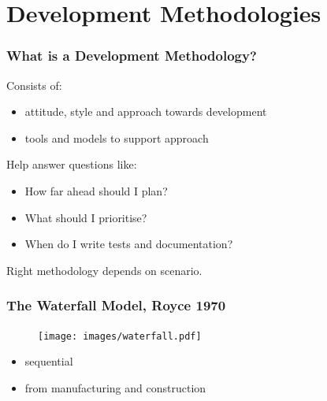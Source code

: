 \documentclass{beamer}
\begin{document}
\section{Development Methodologies}


\begin{frame}
 \frametitle{What is a Development Methodology?}

\begin{block}{Consists of:}
\begin{itemize}
  \item attitude, style and approach towards development
  \item tools and models to support approach
\end{itemize}
\end{block}

\begin{block}{Help answer questions like:}
\begin{itemize}
  \item How far ahead should I plan?
  \item What should I prioritise?
  \item When do I write tests and documentation?
\end{itemize}
\end{block}

\vspace*{5mm}
\centering
\alert<2>{\large Right methodology depends on scenario.}
 
\end{frame}


\begin{frame}
 \frametitle{The Waterfall Model, Royce 1970}
  
\begin{figure}[ht]
  \texttt{[image: images/waterfall.pdf]}
\end{figure}

\begin{itemize}
  \item sequential 
  \item from manufacturing and construction
\end{itemize}
  
\end{frame}

\end{document}
